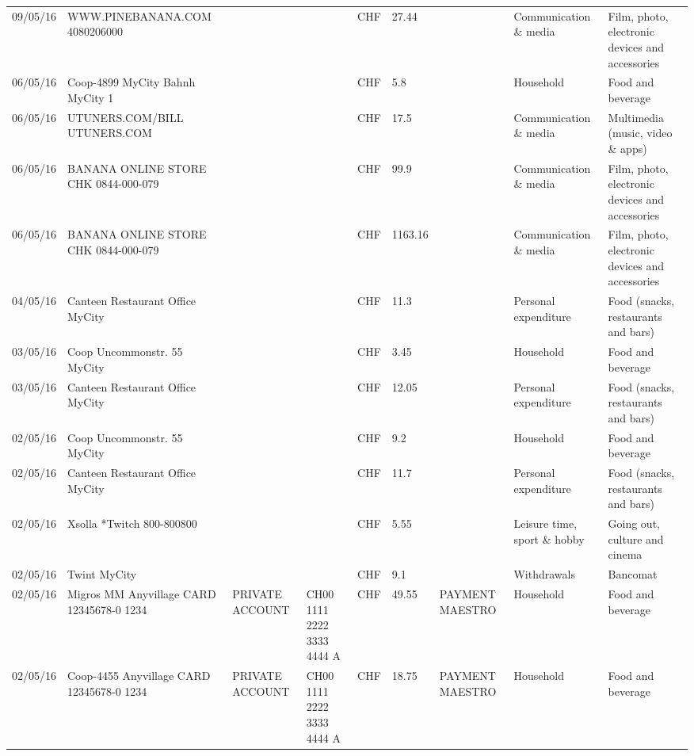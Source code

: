 \begin{landscape}
\begin{center}
\begin{longtable}{lllllllll}
		09/05/16 & WWW.PINEBANANA.COM           4080206000 &       &       & CHF   & 27.44 &       & Communication \& media & Film, photo, electronic devices and accessories \\
		06/05/16 & Coop-4899 MyCity Bahnh   MyCity 1 &       &       & CHF   & 5.8   &       & Household & Food and beverage \\
		06/05/16 & UTUNERS.COM/BILL          UTUNERS.COM &       &       & CHF   & 17.5  &       & Communication \& media & Multimedia (music, video \& apps) \\
		06/05/16 & BANANA ONLINE STORE CHK   0844-000-079 &       &       & CHF   & 99.9  &       & Communication \& media & Film, photo, electronic devices and accessories \\
		06/05/16 & BANANA ONLINE STORE CHK   0844-000-079 &       &       & CHF   & 1163.16 &       & Communication \& media & Film, photo, electronic devices and accessories \\
		04/05/16 & Canteen Restaurant Office      MyCity &       &       & CHF   & 11.3  &       & Personal expenditure & Food (snacks, restaurants and bars) \\
		03/05/16 & Coop Uncommonstr. 55   MyCity &       &       & CHF   & 3.45  &       & Household & Food and beverage \\
		03/05/16 & Canteen Restaurant Office      MyCity &       &       & CHF   & 12.05 &       & Personal expenditure & Food (snacks, restaurants and bars) \\
		02/05/16 & Coop Uncommonstr. 55   MyCity &       &       & CHF   & 9.2   &       & Household & Food and beverage \\
		02/05/16 & Canteen Restaurant Office      MyCity &       &       & CHF   & 11.7  &       & Personal expenditure & Food (snacks, restaurants and bars) \\
		02/05/16 & Xsolla *Twitch           800-800800 &       &       & CHF   & 5.55  &       & Leisure time, sport \& hobby & Going out, culture and cinema \\
		02/05/16 & Twint               MyCity &       &       & CHF   & 9.1   &       & Withdrawals & Bancomat \\
		02/05/16 & Migros MM Anyvillage CARD 12345678-0 1234 & PRIVATE ACCOUNT & CH00 1111 2222 3333 4444 A & CHF   & 49.55 & PAYMENT MAESTRO & Household & Food and beverage \\
		02/05/16 & Coop-4455 Anyvillage CARD 12345678-0 1234 & PRIVATE ACCOUNT & CH00 1111 2222 3333 4444 A & CHF   & 18.75 & PAYMENT MAESTRO & Household & Food and beverage \\

\end{longtable}
\end{center}
\end{landscape}
